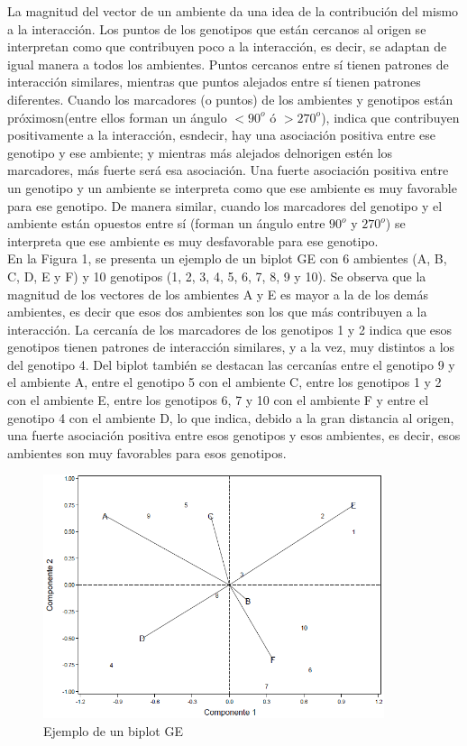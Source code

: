 La magnitud del vector de un ambiente da una idea de la contribución del mismo a la
interacción. Los puntos de los genotipos que están cercanos al origen se interpretan como que contribuyen poco a la interacción, es decir, se adaptan de igual manera a todos los ambientes. Puntos cercanos entre sí tienen patrones de interacción similares, mientras que puntos alejados entre sí tienen patrones diferentes. Cuando los marcadores (o puntos) de los ambientes y genotipos están próximosn(entre ellos forman un ángulo $< 90^o$ ó $> 270^o$), indica que contribuyen positivamente a la interacción, esndecir, hay una asociación positiva entre ese genotipo y ese ambiente; y mientras más alejados delnorigen estén los marcadores, más fuerte será esa asociación. Una fuerte asociación positiva entre un
genotipo y un ambiente se interpreta como que ese ambiente es muy favorable para ese genotipo. De
manera similar, cuando los marcadores del genotipo y el ambiente están opuestos entre sí (forman un
ángulo entre $90^o$ y $270^o$) se interpreta que ese ambiente es muy desfavorable para ese genotipo.\\
En la Figura 1, se presenta un ejemplo de un biplot GE con 6 ambientes (A, B, C, D, E y F) y
10 genotipos (1, 2, 3, 4, 5, 6, 7, 8, 9 y 10). Se observa que la magnitud de los vectores de los ambientes
A y E es mayor a la de los demás ambientes, es decir que esos dos ambientes son los que
más contribuyen a la interacción. La cercanía de los marcadores de los genotipos 1 y 2 indica que esos
genotipos tienen patrones de interacción similares, y a la vez, muy distintos a los del genotipo 4. Del
biplot también se destacan las cercanías entre el genotipo 9 y el ambiente A, entre el genotipo 5 con el
ambiente C, entre los genotipos 1 y 2 con el ambiente E, entre los genotipos 6, 7 y 10 con el ambiente F
y entre el genotipo 4 con el ambiente D, lo que indica, debido a la gran distancia al origen, una fuerte
asociación positiva entre esos genotipos y esos ambientes, es decir, esos ambientes son muy favorables
para esos genotipos.\\

\begin{figure}[h]
	\begin{center}
		\includegraphics[width=10cm]{./Graficos/GE.png}
	\end{center}
	\caption{Ejemplo de un biplot GE}
\end{figure}

